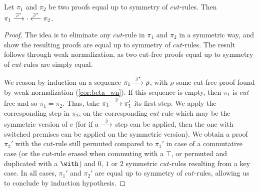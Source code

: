 \documentclass{lmcs}
\newcommand{\symboltext}[2]{\mathrel{\overset{\makebox[0pt]{\mbox{\normalfont\tiny\sffamily \ensuremath{#1}}}}{#2}}} %
\newcommand{\betabar}{\overline{\beta}}
\newcommand{\betabarto}{\symboltext{\betabar}{\longrightarrow}}
\newcommand{\betabartostar}{\symboltext{\betabar^*}{\longrightarrow}}
\newcommand{\betabarfromstar}{\symboltext{\betabar^*}{\longleftarrow}}
\begin{document}
\begin{lem}
\label{lem:comm_cut_betabarto}
Let $\pi_1$ and $\pi_2$ be two proofs equal up to symmetry of $cut$-rules.
Then $\pi_1\betabartostar\cdot\betabarfromstar\pi_2$.
\end{lem}
\begin{proof}
The idea is to eliminate any $cut$-rule in $\pi_1$ and $\pi_2$ in a symmetric way, and show the resulting proofs are equal up to symmetry of $cut$-rules.
The result follows through weak normalization, as two cut-free proofs equal up to symmetry of $cut$-rules are simply equal.

We reason by induction on a sequence $\pi_1\betabartostar\rho$, with $\rho$ some cut-free proof found by weak normalization (\autoref{cor:beta_wn}).
If this sequence is empty, then $\pi_1$ is $cut$-free and so $\pi_1=\pi_2$.
Thus, take $\pi_1\betabarto\pi_1'$ its first step.
We apply the corresponding step in $\pi_2$, on the corresponding $cut$-rule which may be the symmetric version of $c$ (for if a $\betabarto$ step can be applied, then the one with switched premises can be applied on the symmetric version).
We obtain a proof $\pi_2'$ with the $cut$-rule still permuted compared to $\pi_1'$ in case of a commutative case (or the $cut$-rule erased when commuting with a $\top$, or permuted and duplicated with a $\with$) and $0$, $1$ or $2$ symmetric $cut$-rules resulting from a key case.
In all cases, $\pi_1'$ and $\pi_2'$ are equal up to symmetry of $cut$-rules, allowing us to conclude by induction hypothesis.
\end{proof}
\end{document}
